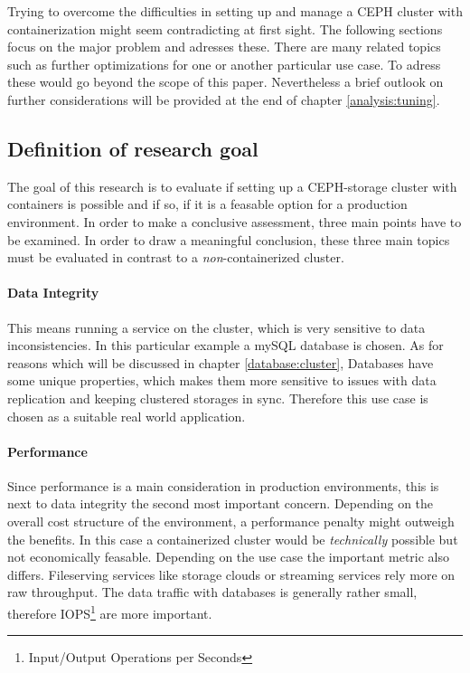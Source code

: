 \documentclass[titlepage, a4paper, 11pt]{scrartcl}
\begin{document}
            Trying to overcome the difficulties in setting up and manage a CEPH cluster with containerization might seem contradicting
            at first sight. The following sections focus on the major problem and adresses these. There are many related topics such as
            further optimizations for one or another particular use case. To adress these would go beyond the scope of this paper.
            Nevertheless a brief outlook on further considerations will be provided at the end of chapter \ref*{analysis:tuning}.

        \subsection{Definition of research goal}   
        
            The goal of this research is to evaluate if setting up a CEPH-storage cluster with containers is possible and if so, 
            if it is a feasable option for a production environment. In order to make a conclusive assessment, three main points 
            have to be examined. In order to draw a meaningful conclusion, these three main topics must be evaluated in contrast
            to a \textit{non}-containerized cluster.

            \paragraph{Data Integrity}

                This means running a service on the cluster, which is very sensitive to data inconsistencies.
                In this particular example a mySQL database is chosen. As for reasons which will be discussed in 
                chapter \ref*{database:cluster}, Databases have some unique properties, which makes them more sensitive 
                to issues with data replication and keeping clustered storages in sync. 
                Therefore this use case is chosen as a suitable real world application.

            \paragraph{Performance}

                Since performance is a main consideration in production environments, this is next to data integrity
                the second most important concern. Depending on the overall cost structure of the environment, 
                a performance penalty might outweigh the benefits. In this case a containerized cluster 
                would be \textit{technically} possible but not economically feasable. Depending on the use case
                the important metric also differs. Fileserving services like storage clouds or streaming services 
                rely more on raw throughput. The data traffic with databases is generally rather small, therefore
                IOPS\footnote{Input/Output Operations per Seconds} are more important.
\end{document}
